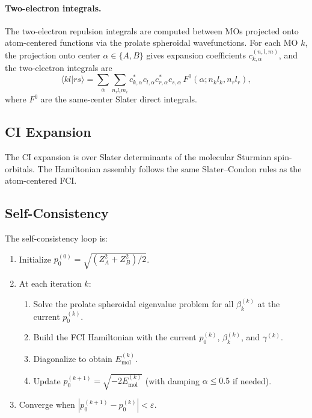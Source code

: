 \paragraph{Two-electron integrals.}
The two-electron repulsion integrals are computed between MOs projected
onto atom-centered functions via the prolate spheroidal wavefunctions.
For each MO $k$, the projection onto center $\alpha \in \{A, B\}$
gives expansion coefficients $c_{k,\alpha}^{(n,l,m)}$, and the
two-electron integrals are
\begin{equation}
\langle kl | rs \rangle = \sum_{\alpha} \sum_{n_i l_i m_i}
c_{k,\alpha}^* c_{l,\alpha} c_{r,\alpha}^* c_{s,\alpha}\,
F^0(\alpha; n_k l_k, n_r l_r),
\end{equation}
where $F^0$ are the same-center Slater direct integrals.

\subsection{CI Expansion}

The CI expansion is over Slater determinants of the molecular Sturmian
spin-orbitals.  The Hamiltonian assembly follows the same Slater--Condon
rules as the atom-centered FCI.

\subsection{Self-Consistency}

The self-consistency loop is:
\begin{enumerate}
\item Initialize $p_0^{(0)} = \sqrt{(Z_A^2 + Z_B^2)/2}$.
\item At each iteration $k$:
  \begin{enumerate}
  \item Solve the prolate spheroidal eigenvalue problem for all
  $\beta_k^{(k)}$ at the current $p_0^{(k)}$.
  \item Build the FCI Hamiltonian with the current $p_0^{(k)}$,
  $\beta_k^{(k)}$, and $\gamma^{(k)}$.
  \item Diagonalize to obtain $E_{\text{mol}}^{(k)}$.
  \item Update $p_0^{(k+1)} = \sqrt{-2E_{\text{mol}}^{(k)}}$
  (with damping $\alpha \leq 0.5$ if needed).
  \end{enumerate}
\item Converge when $|p_0^{(k+1)} - p_0^{(k)}| < \varepsilon$.
\end{enumerate}
